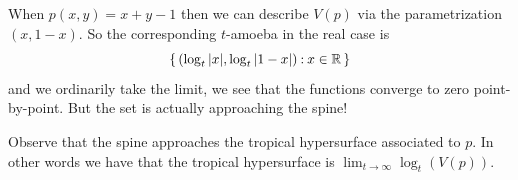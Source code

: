 \documentclass[12pt]{memoir}
\begin{document}
\begin{Ex}
    When $p(x,y)=x+y-1$ then we can describe $V(p)$ via the parametrization $(x,1-x)$. So the corresponding $t$-amoeba in the real case is 
    $$\{\,(\log_t|x|,\log_t|1-x|)\mathbin{:} x\in\mathbb{R}\,\}$$
    and we ordinarily take the limit, we see that the functions converge to zero point-by-point. But the set is actually approaching the spine!
    \begin{figure}[h!]
        \centering
        \quad
        \quad
        \label{fig:2.4-thru-2.6}
    \end{figure}
\end{Ex}

Observe that the spine approaches the tropical hypersurface associated to $p$. In other words we have that the tropical hypersurface is $\lim_{t\to\infty}\log_t(V(p))$.
\end{document}
